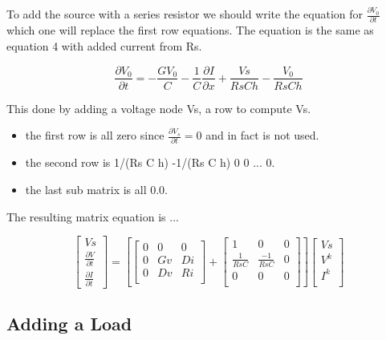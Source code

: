 \documentclass[12pt, letterpaper]{article}
\begin{document}
To add the source with a series resistor we should write the equation for $\frac{\partial{V_0}}{\partial{t}}$ which one will replace the first row equations. The equation is the same as equation 4 with added current from Rs.

\begin{equation} \frac{\partial{V_0}}{\partial{t}} = -\frac{G V_0}{C} - \frac{1}{C} \frac{\partial{I}}{\partial{x}} + \frac{Vs}{Rs C h} - \frac{V_0}{Rs C h}
\end{equation}



This done by adding a voltage node Vs, a row to compute Vs.

\begin{itemize}
\item the first row is all zero since $\frac{\partial V_s}{\partial t} = 0$ and in fact is not used.
\item the second row is 1/(Rs C h) -1/(Rs C h) 0 0 ... 0.
\item the last sub matrix is all 0.0.
\end{itemize}

The resulting matrix equation is ...


\begin{equation}
\begin{bmatrix}
	Vs \\
	\frac{\partial{V}}{\partial{t}} \\
	\frac{\partial{I}}{\partial{t}} 
\end{bmatrix}	
=
\left[ 
\begin{bmatrix}
	0 & 0 & 0 \\
	0 & Gv & Di \\
	0 & Dv & Ri \\
\end{bmatrix}
+
\begin{bmatrix}
	1 & 0 & 0 \\
	\frac{1}{Rs C} & \frac{-1}{Rs C} & 0 \\
	0 & 0 & 0 \\
\end{bmatrix}
\right]
\begin{bmatrix}
	Vs \\
	V^k \\
	I^k \\
\end{bmatrix}
\end{equation}

\subsection{Adding a Load}
\end{document}
